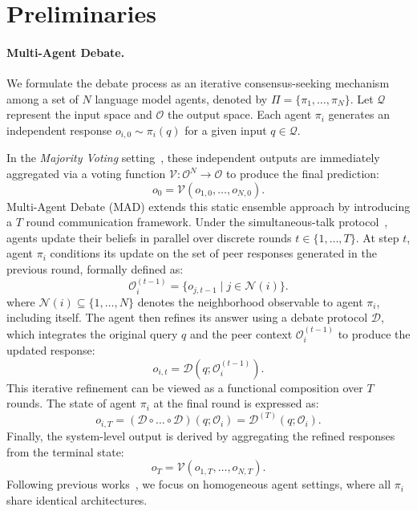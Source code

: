 \section{Preliminaries}
\label{preliminaries}

\paragraph{Multi-Agent Debate.}
We formulate the debate process as an iterative consensus-seeking mechanism among a set of $N$ language model agents, denoted by $\Pi = \{\pi_1, \dots, \pi_N\}$. Let $\mathcal{Q}$ represent the input space and $\mathcal{O}$ the output space. Each agent $\pi_i$ generates an independent response $o_{i,0} \sim \pi_i(q)$ for a given input $q \in \mathcal{Q}$.

In the \textit{Majority Voting} setting~\cite{zhao2025surveylargelanguagemodels}, these independent outputs are immediately aggregated via a voting function $\mathcal{V}: \mathcal{O}^N \rightarrow \mathcal{O}$ to produce the final prediction:
\begin{equation}
    o_0 = \mathcal{V}(o_{1,0}, \dots, o_{N,0}).
\end{equation}
Multi-Agent Debate (MAD) extends this static ensemble approach by introducing a $T$ round communication framework. Under the simultaneous-talk protocol~\cite{chan2023chateval,choi2025debate}, agents update their beliefs in parallel over discrete rounds $t \in \{1, \dots, T\}$. At step $t$, agent $\pi_i$ conditions its update on the set of peer responses generated in the previous round, formally defined as:
\begin{equation}
    \mathcal{O}_i^{(t-1)} = \{ o_{j,t-1} \mid j \in \mathcal{N}(i) \}.
\end{equation}
where $\mathcal{N}(i) \subseteq \{1, \dots, N\}$ denotes the neighborhood observable to agent $\pi_i$, including itself. The agent then refines its answer using a debate protocol $\mathcal{D}$, which integrates the original query $q$ and the peer context $\mathcal{O}_i^{(t-1)}$ to produce the updated response:
\begin{equation}
    o_{i,t} = \mathcal{D}\left(q; \mathcal{O}_i^{(t-1)}\right).
\end{equation}
This iterative refinement can be viewed as a functional composition over $T$ rounds. The state of agent $\pi_i$ at the final round is expressed as:
\begin{equation}
    o_{i,T} = (\mathcal{D} \circ \dots \circ \mathcal{D})(q; \mathcal{O}_i) = \mathcal{D}^{(T)}(q; \mathcal{O}_i).
\end{equation}
Finally, the system-level output is derived by aggregating the refined responses from the terminal state:
\begin{equation}
    o_T = \mathcal{V}(o_{1,T}, \dots, o_{N,T}).
\end{equation}
Following previous works~\cite{choi2025debate,yi2025debate}, we focus on homogeneous agent settings, where all $\pi_i$ share identical architectures.


